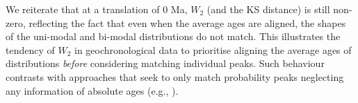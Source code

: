 \documentclass[gchron, manuscript]{copernicus}
\begin{document}
We reiterate that at a translation of 0 Ma, $W_2$ (and the KS distance) is still non-zero, reflecting the fact that even when the average ages are aligned, the shapes of the uni-modal and bi-modal distributions do not match. This illustrates the tendency of $W_2$ in geochronological data to prioritise aligning the average ages of distributions \textit{before} considering matching individual peaks. Such behaviour contrasts with approaches that seek to only match probability peaks neglecting any information of absolute ages (e.g., \citealt{saylor_quantifying_2016}).


\end{document}
